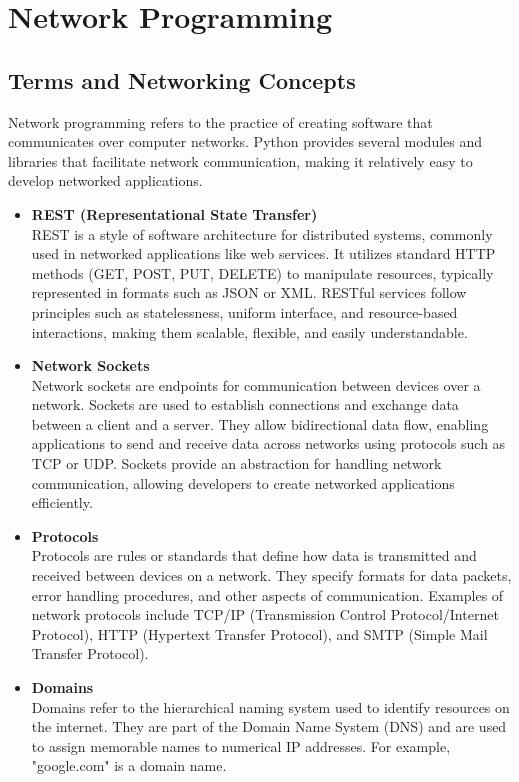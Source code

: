 \section{Network Programming}

\subsection{Terms and Networking Concepts}
Network programming refers to the practice of creating software that communicates over computer networks. Python provides several modules and libraries that facilitate network communication, making it relatively easy to develop networked applications.

\begin{itemize}
    \item \textbf{REST (Representational State Transfer)}\\
    REST is a style of software architecture for distributed systems, commonly used in networked applications like web services. It utilizes standard HTTP methods (GET, POST, PUT, DELETE) to manipulate resources, typically represented in formats such as JSON or XML. RESTful services follow principles such as statelessness, uniform interface, and resource-based interactions, making them scalable, flexible, and easily understandable.
    
    \item \textbf{Network Sockets}\\
    Network sockets are endpoints for communication between devices over a network. Sockets are used to establish connections and exchange data between a client and a server. They allow bidirectional data flow, enabling applications to send and receive data across networks using protocols such as TCP or UDP. Sockets provide an abstraction for handling network communication, allowing developers to create networked applications efficiently.
    
    \item \textbf{Protocols}\\
    Protocols are rules or standards that define how data is transmitted and received between devices on a network. They specify formats for data packets, error handling procedures, and other aspects of communication. Examples of network protocols include TCP/IP (Transmission Control Protocol/Internet Protocol), HTTP (Hypertext Transfer Protocol), and SMTP (Simple Mail Transfer Protocol).
    
    \item \textbf{Domains}\\
    Domains refer to the hierarchical naming system used to identify resources on the internet. They are part of the Domain Name System (DNS) and are used to assign memorable names to numerical IP addresses. For example, "google.com" is a domain name.
    

\end{itemize}
